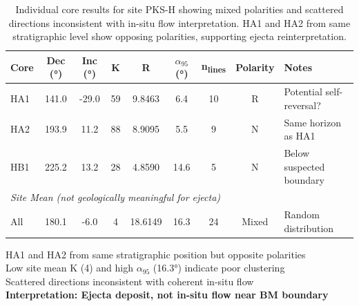 \begin{table}[htbp]
    \centering
    \caption{Individual core results for site PKS-H showing mixed polarities and scattered directions inconsistent with in-situ flow interpretation. HA1 and HA2 from same stratigraphic level show opposing polarities, supporting ejecta reinterpretation.}
    \label{tab:pksh_details}
    \footnotesize
    \begin{tabular}{|l|c|c|c|c|c|c|c|l|}
        \hline
        \textbf{Core} & \textbf{Dec (°)} & \textbf{Inc (°)} & \textbf{K} & \textbf{R} & \textbf{$\alpha_{95}$ (°)} & \textbf{n\textsubscript{lines}} & \textbf{Polarity} & \textbf{Notes} \\
        \hline
        HA1 & 141.0 & -29.0 & 59 & 9.8463 & 6.4 & 10 & R & Potential self-reversal? \\
        HA2 & 193.9 & 11.2 & 88 & 8.9095 & 5.5 & 9 & N & Same horizon as HA1 \\
        HB1 & 225.2 & 13.2 & 28 & 4.8590 & 14.6 & 5 & N & Below suspected boundary \\
        \hline
        \multicolumn{9}{|l|}{\textit{Site Mean (not geologically meaningful for ejecta)}} \\
        \hline
        All & 180.1 & -6.0 & 4 & 18.6149 & 16.3 & 24 & Mixed & Random distribution \\
        \hline
    \end{tabular}
    
    \vspace{0.5em}
    \raggedright
    \footnotesize
    HA1 and HA2 from same stratigraphic position but opposite polarities\\
    Low site mean K (4) and high $\alpha_{95}$ (16.3°) indicate poor clustering\\
    Scattered directions inconsistent with coherent in-situ flow\\
    \textbf{Interpretation: Ejecta deposit, not in-situ flow near BM boundary}
\end{table}


